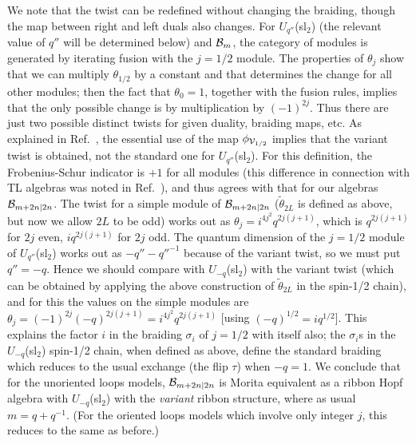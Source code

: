 \documentclass[twocolumn,floats,pra]{revtex4}
\begin{document}
We note that the twist can be redefined without changing the
braiding, though the map between right and left duals also
changes. For $U_{q''}$(sl$_2$) (the relevant value of $q''$ will
be determined below) and ${\cal B}_m$, the category of modules is
generated by iterating fusion with the $j=1/2$ module. The
properties of $\theta_j$ show that we can multiply $\theta_{1/2}$
by a constant and that determines the change for all other
modules; then the fact that $\theta_0=1$, together with the fusion
rules, implies that the only possible change is by multiplication
by $(-1)^{2j}$. Thus there are just two possible distinct twists
for given duality, braiding maps, etc. As explained in Ref.\
\cite{bk35}, the essential use of the map $\phi_{{\cal V}_{1/2}}$
implies that the variant twist is obtained, not the standard one
for $U_{q''}$(sl$_2$). For this definition, the Frobenius-Schur
indicator is $+1$ for all modules (this difference in connection
with TL algebras was noted in Ref.\ \cite{lw}), and thus agrees
with that for our algebras ${\cal B}_{m+2n|2n}$. The twist for a
simple module of ${\cal B}_{m+2n|2n}$ ($\widetilde{\theta}_{2L}$
is defined as above, but now we allow $2L$ to be odd) works out as
$\theta_j=i^{4j^2}q^{2j(j+1)}$, which is $q^{2j(j+1)}$ for $2j$
even, $iq^{2j(j+1)}$ for $2j$ odd. The quantum dimension of the
$j=1/2$ module of $U_{q''}$(sl$_2$) works out as $-q''-q''^{-1}$
because of the variant twist, so we must put $q''=-q$. Hence we
should compare with $U_{-q}$(sl$_2$) with the variant twist (which
can be obtained by applying the above construction of
$\widetilde{\theta}_{2L}$ in the spin-1/2 chain), and for this the
values on the simple modules are
$\theta_j=(-1)^{2j}(-q)^{2j(j+1)}=i^{4j^2}q^{2j(j+1)}$ [using
$(-q)^{1/2}=iq^{1/2}$]. This explains the factor $i$ in the
braiding $\sigma_i$ of $j=1/2$ with itself also; the $\sigma_i$s
in the $U_{-q}$(sl$_2$) spin-1/2 chain, when defined as above,
define the standard braiding which reduces to the usual exchange
(the flip $\tau$) when $-q=1$. We conclude that for the unoriented
loops models, ${\cal B}_{m+2n|2n}$ is Morita equivalent as a
ribbon Hopf algebra with $U_{-q}$(sl$_2$) with the {\em variant}
ribbon structure, where as usual $m=q+q^{-1}$. (For the oriented
loops models which involve only integer $j$, this reduces to the
same as before.)
\end{document}
